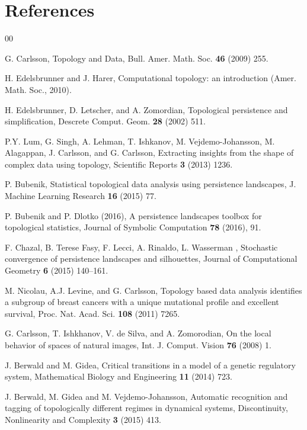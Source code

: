 \documentclass[preprint,12pt]{elsarticle}
\theoremstyle{definition}
\theoremstyle{remark}
\numberwithin{equation}{section}
\theoremstyle{definition}
\begin{document}
\section*{References}
\begin{thebibliography}{00}

 G. Carlsson, Topology and Data, Bull. Amer. Math. Soc.  \textbf{46}
 (2009) 255.

  H. Edelsbrunner and J. Harer, Computational topology: an introduction (Amer. Math. Soc.,  2010).

  H. Edelsbrunner, D. Letscher, and A. Zomordian, Topological persistence and simplification, Descrete Comput. Geom.  \textbf{28} (2002) 511.

  P.Y. Lum, G. Singh, A. Lehman, T. Ishkanov, M. Vejdemo-Johansson, M. Alagappan, J. Carlsson, and G. Carlsson, Extracting insights from the shape of complex data using topology, Scientific Reports  \textbf{3} (2013) 1236.

  P. Bubenik, Statistical topological data analysis using persistence landscapes, J. Machine Learning Research  \textbf{16} (2015) 77.

  P. Bubenik  and P. Dlotko (2016), A persistence landscapes toolbox for topological statistics, Journal of Symbolic Computation \textbf{78} (2016), 91.

 F. Chazal, B. Terese Fasy, F. Lecci, A. Rinaldo, L. Wasserman , Stochastic convergence of persistence landscapes and silhouettes, Journal of Computational Geometry \textbf{6}  (2015) 140--161.

  M. Nicolau, A.J. Levine, and G. Carlsson, Topology based data analysis identifies a subgroup of breast cancers with a unique mutational profile and excellent survival, Proc. Nat. Acad. Sci.  \textbf{108} (2011) 7265.

 G. Carlsson, T. Ishkhanov, V. de Silva, and A. Zomorodian, On the local behavior of spaces of natural images, Int. J. Comput. Vision  \textbf{76} (2008) 1.


J. Berwald and M. Gidea, Critical transitions in a model of a genetic regulatory system, Mathematical Biology and Engineering \textbf{11} (2014) 723.


  J. Berwald, M. Gidea and M. Vejdemo-Johansson, Automatic recognition and tagging of topologically different regimes in dynamical systems, Discontinuity, Nonlinearity and Complexity  \textbf{3} (2015) 413.




\end{thebibliography}
\end{document}
